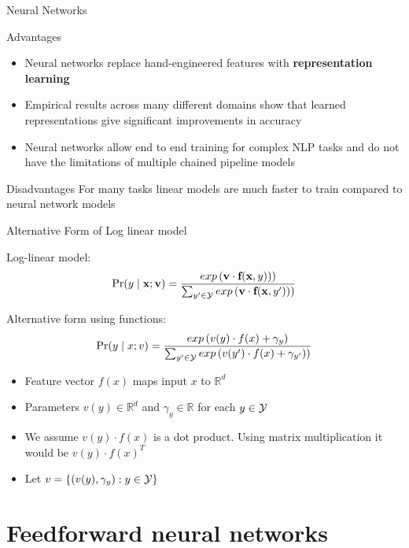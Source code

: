 \begin{frame}{Neural Networks}
\begin{block}{Advantages}
\begin{itemize}[<+->]
\item Neural networks replace hand-engineered features with \textbf{representation learning}
\item Empirical results across many different domains show that learned representations give significant improvements in accuracy
\item Neural networks allow end to end training for complex NLP tasks and do not have the limitations of multiple chained pipeline models 
\end{itemize}
\end{block}
\pause
\begin{block}{Disadvantages}
For many tasks linear models are much faster to train compared to neural network models
\end{block}
\end{frame}

\begin{frame}{Alternative Form of Log linear model}
\begin{block}{Log-linear model:}
\[ \Pr(y \mid \textbf{x}; \textbf{v}) = \frac{exp\left(\textbf{v} \cdot \textbf{f}(\textbf{x}, y))\right)}{\sum_{y' \in {\cal Y}} exp\left(\textbf{v} \cdot \textbf{f}(\textbf{x}, y'))\right)} \]
\end{block}

\begin{block}{Alternative form using functions:}
\[ \Pr(y \mid x; v) = \frac{exp\left(v(y) \cdot f(x) + \gamma_y \right)}{\sum_{y' \in {\cal Y}} exp\left(v(y') \cdot f(x) + \gamma_{y'})\right)} \]
\end{block}

\begin{itemize}[<+->]
\item Feature vector $f(x)$ maps input $x$ to $\mathbb{R}^d$
\item Parameters $v(y) \in \mathbb{R}^d$ and $\gamma_y \in \mathbb{R}$ for each $y \in {\cal Y}$
\item We assume $v(y) \cdot f(x)$ is a dot product. Using matrix multiplication it would be $v(y) \cdot f(x)^T$
\item Let $v = \{ (v(y), \gamma_y) : y \in {\cal Y} \} $
\end{itemize}
\end{frame}

\section{Feedforward neural networks}
\frame{\tableofcontents[currentsection]}

